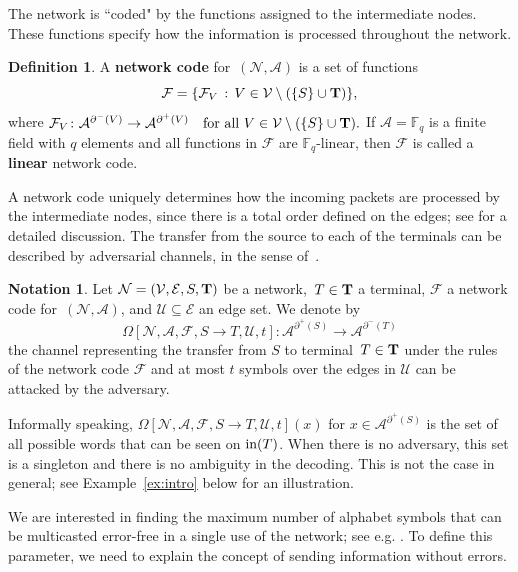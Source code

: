 \documentclass[11pt,a4paper]{article}
\theoremstyle{definition}
\newtheorem{definition}[theorem]{Definition}
\newtheorem{notation}[theorem]{Notation}
\newcommand{\numberset}{\mathds}
\newcommand{\F}{\numberset{F}}
\newcommand{\mA}{\mathcal{A}}
\newcommand{\mN}{\mathcal{N}}
\newcommand{\mF}{\mathcal{F}}
\newcommand{\mU}{\mathcal{U}}
\newcommand{\st}{\, : \,}
\newcommand{\mE}{\mathcal{E}}
\newcommand{\mV}{\mathcal{V}}
\newcommand{\inn}{\textnormal{in}}
\newcommand{\bd}[1]{{\bf #1}}
\newcommand{\bfT}{\bf T}
\newcommand{\degin}{\partial^-}
\newcommand{\degout}{\partial^+}
\begin{document}
The network is ``coded" by the functions assigned to the intermediate nodes. These functions specify how the information is processed throughout the network. 


\begin{definition}
\label{def:nc}
A \textbf{network code} for~$(\mN,\mA)$ is a set of functions $$\mF=\{\mF_V \st V \in \mV \setminus (\{S\} \cup \bfT)\},$$ where $\mF_V \colon \mA^{\degin(V)} \to \mA^{\degout(V)} \quad \mbox{for all } V \in \mV \setminus (\{S\} \cup \bfT).$ If $\mA = \F_q$ is a finite field with $q$ elements and all functions in $\mF$ are $\F_q$-linear, then $\mF$ is called a \textbf{linear} network code.

 
\end{definition}

A network code uniquely determines how the incoming packets are processed by the intermediate nodes, since there is a total order defined on the edges; see \cite{ravagnani2018adversarial} for a detailed discussion. 
The transfer from the source to each of the terminals can be described by adversarial channels, in the sense of~\cite{beemer2023network,ravagnani2018adversarial}.




\begin{notation} 
\label{not:netch}
Let $\mN=(\mV,\mE, S, \bfT)$ be a network,~$T \in \bfT$ a terminal, $\mF$ a network code for~$(\mN,\mA)$, and $\mU \subseteq \mE$ an edge set. We denote by
$$\Omega[\mN, \mA, \mF, S \to T,\mU,t] : \mA^{\degout(S)} \rightarrow \mA^{\degin(T)}$$
the channel representing the transfer from $S$ to terminal~$T \in \bd{T}$ under the rules of the network code $\mF$ and at most $t$ symbols over the edges in $\mU$ can be attacked by the adversary. 
\end{notation}

Informally speaking, $\Omega[\mN, \mA, \mF, S \to T,\mU,t](x)$ for $x \in \mA^{\degout(S)}$ is the set of all possible words that can be seen on $\inn(T)$. When there is no 
adversary, this set is a singleton and there is no ambiguity in the decoding.
This is not the case in general;
see Example~\ref{ex:intro} below for an illustration.

We are interested in finding the maximum number of alphabet symbols that can be multicasted error-free in a single use of the network; see e.g. \cite{cai2006network, yeung2006network}. To define this parameter, we need to explain the concept of sending information without errors.
\end{document}
